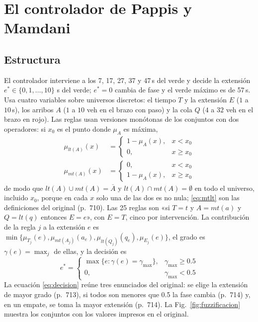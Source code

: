 \documentclass[journal]{IEEEtran}
\begin{document}
\section{El controlador de Pappis y Mamdani}
\label{sec:pappis}

\subsection{Estructura}
\label{sec:estructura}
El controlador interviene a los 7, 17, 27, 37 y 47\,s del verde y decide la extensión $e^*\in\{0,1,\dots,10\}$ s del verde; $e^*=0$ cambia de fase y el verde máximo es de 57\,s. Usa cuatro variables sobre universos discretos: el tiempo $T$ y la extensión $E$ ($1$ a $10$\,s), los arribos $A$ ($1$ a $10$ veh en el brazo con paso) y la cola $Q$ ($4$ a $32$ veh en el brazo en rojo). Las reglas usan versiones monótonas de los conjuntos con dos operadores: si $x_0$ es el punto donde $\mu_A$ es máxima,
\begin{equation}
\begin{aligned}
\mu_{lt(A)}(x)&=\begin{cases}1-\mu_A(x), & x<x_0\\ 0, & x\ge x_0\end{cases}\\
\mu_{mt(A)}(x)&=\begin{cases}0, & x<x_0\\ 1-\mu_A(x), & x\ge x_0\end{cases}
\end{aligned}
\label{eq:mtlt}
\end{equation}
de modo que $lt(A)\cup mt(A)=\overline{A}$ y $lt(A)\cap mt(A)=\emptyset$ en todo el universo, incluido $x_0$, porque en cada $x$ solo una de las dos es no nula; \eqref{eq:mtlt} son las definiciones del original (p.~710). Las 25 reglas son «si $T=t$ y $A=mt(a)$ y $Q=lt(q)$ entonces $E=e$», con $E=T$, cinco por intervención. La contribución de la regla $j$ a la extensión $e$ es $\min\{\mu_{T_j}(e),\mu_{mt(A_j)}(a_e),\mu_{lt(Q_j)}(q_e),\mu_{E_j}(e)\}$, el grado es $\gamma(e)=\max_j$ de ellas, y la decisión es
\begin{equation}
e^*=\begin{cases}\max\{e:\gamma(e)=\gamma_{\max}\}, & \gamma_{\max}\ge 0.5\\ 0, & \gamma_{\max}<0.5\end{cases}
\label{eq:decision}
\end{equation}
La ecuación \eqref{eq:decision} reúne tres enunciados del original: se elige la extensión de mayor grado (p.~713), si todos son menores que 0.5 la fase cambia (p.~714) y, en un empate, se toma la mayor extensión (p.~714). La Fig.~\ref{fig:fuzzificacion} muestra los conjuntos con los valores impresos en el original.
\end{document}
